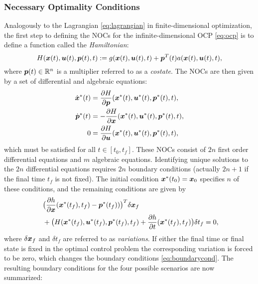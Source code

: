 \subsubsection{Necessary Optimality Conditions}
Analogously to the Lagrangian \eqref{eq:lagrangian} in finite-dimensional optimization, the first step to defining the NOCs for the infinite-dimensional OCP \eqref{eq:ocp} is to define a function called the \textit{Hamiltonian}:
\begin{equation} \label{eq:hamiltonian}
H(\bm{x}(t), \bm{u}(t), \bm{p}(t), t) := g(\bm{x}(t), \bm{u}(t), t) + \bm{p}^T(t)a(\bm{x}(t), \bm{u}(t), t),
\end{equation}
where $\bm{p}(t) \in \mathbb{R}^n$ is a multiplier referred to as a \textit{costate}. The NOCs are then given by a set of differential and algebraic equations:
\begin{equation} \label{eq:optnoc}
\begin{split}
\dot{\bm{x}}^*(t) &= \frac{\partial{H}}{\partial{\bm{p}}}(\bm{x}^*(t), \bm{u}^*(t), \bm{p}^*(t), t), \\
\dot{\bm{p}}^*(t) &= -\frac{\partial{H}}{\partial{\bm{x}}}(\bm{x}^*(t), \bm{u}^*(t), \bm{p}^*(t), t), \\
0 &= \frac{\partial{H}}{\partial{\bm{u}}}(\bm{x}^*(t), \bm{u}^*(t), \bm{p}^*(t), t),
\end{split}
\end{equation}
which must be satisfied for all $t \in [t_0, t_f]$. These NOCs consist of $2n$ first order differential equations and $m$ algebraic equations. Identifying unique solutions to the $2n$ differential equations requires $2n$ boundary conditions (actually $2n+1$ if the final time $t_f$ is not fixed). The initial condition $\bm{x}^*(t_0) = \bm{x}_0$ specifies $n$ of these conditions, and the remaining conditions are given by
\begin{equation} \label{eq:boundarycond}
\begin{split}
&\big(\frac{\partial{h}}{\partial{\bm{x}}}(\bm{x}^*(t_f), t_f) - \bm{p}^*(t_f))\big)^T\delta{\bm{x}_f}\\\
& + \big(H(\bm{x}^*(t_f), \bm{u}^*(t_f), \bm{p}^*(t_f), t_f) +\frac{\partial{h}}{\partial{t}}(\bm{x}^*(t_f), t_f)\big)\delta t_f = 0,\\
\end{split}
\end{equation}
where $\delta \bm{x}_f$ and $\delta t_f$ are referred to as \textit{variations}. If either the final time or final state is fixed in the optimal control problem the corresponding variation is forced to be zero, which changes the boundary conditions \eqref{eq:boundarycond}. The resulting boundary conditions for the four possible scenarios are now summarized:

